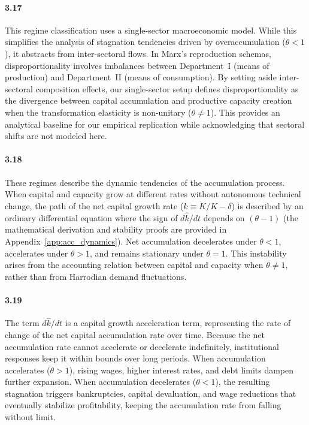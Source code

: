 \paragraph{3.17}
This regime classification uses a single-sector macroeconomic model. While this simplifies the analysis of stagnation tendencies driven by overaccumulation ($\theta < 1$), it abstracts from inter-sectoral flows. In Marx's reproduction schemas, disproportionality involves imbalances between Department~I (means of production) and Department~II (means of consumption). By setting aside inter-sectoral composition effects, our single-sector setup defines disproportionality as the divergence between capital accumulation and productive capacity creation when the transformation elasticity is non-unitary ($\theta \neq 1$). This provides an analytical baseline for our empirical replication while acknowledging that sectoral shifts are not modeled here.

\paragraph{3.18}
These regimes describe the dynamic tendencies of the accumulation process. When capital and capacity grow at different rates without autonomous technical change, the path of the net capital growth rate ($\hat{k} \equiv \dot{K}/K - \delta$) is described by an ordinary differential equation where the sign of $d\hat{k}/dt$ depends on $(\theta - 1)$ (the mathematical derivation and stability proofs are provided in Appendix~\ref{app:acc_dynamics}). Net accumulation decelerates under $\theta < 1$, accelerates under $\theta > 1$, and remains stationary under $\theta = 1$. This instability arises from the accounting relation between capital and capacity when $\theta \neq 1$, rather than from Harrodian demand fluctuations.

\paragraph{3.19}
The term $d\hat{k}/dt$ is a capital growth acceleration term, representing the rate of change of the net capital accumulation rate over time. Because the net accumulation rate cannot accelerate or decelerate indefinitely, institutional responses keep it within bounds over long periods. When accumulation accelerates ($\theta > 1$), rising wages, higher interest rates, and debt limits dampen further expansion. When accumulation decelerates ($\theta < 1$), the resulting stagnation triggers bankruptcies, capital devaluation, and wage reductions that eventually stabilize profitability, keeping the accumulation rate from falling without limit.

